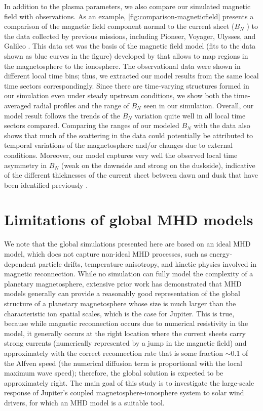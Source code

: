 In addition to the plasma parameters, we also compare our simulated magnetic field with observations. As an example, \ref{fig:comparison-magneticfield} presents a comparison of the magnetic field component normal to the current sheet ($B_N$ ) to the data collected by previous missions, including Pioneer, Voyager, Ulysses, and Galileo \cite{Vogt2011a}. This data set was the basis of the magnetic field model (fits to the data shown as blue curves in the figure) developed by \cite{Vogt2011a} that allows to map regions in the magnetosphere to the ionosphere. The observational data were shown in different local time bins; thus, we extracted our model results from the same local time sectors correspondingly. Since there are time‐varying structures formed in our simulation even under steady upstream conditions, we show both the time‐averaged radial profiles and the range of $B_N$ seen in our simulation. Overall, our model result follows the trends of the $B_N$ variation quite well in all local time sectors compared. Comparing the ranges of our modeled $B_N$ with the data also shows that much of the scattering in the data could potentially be attributed to temporal variations of the magnetosphere and/or changes due to external conditions. Moreover, our model captures very well the observed local time asymmetry in $B_N$ (weak on the dawnside and strong on the duskside), indicative of the different thicknesses of the current sheet between dawn and dusk that have been identified previously \cite{Khurana2005,Kivelson2002a}.

\section{Limitations of global MHD models}
We note that the global simulations presented here are based on an ideal MHD model, which does not capture non-ideal MHD processes, such as energy‐dependent particle drifts, temperature anisotropy, and kinetic physics involved in magnetic reconnection. While no simulation can fully model the complexity of a planetary magnetosphere, extensive prior work has demonstrated that MHD models generally can provide a reasonably good representation of the global structure of a planetary magnetosphere whose size is much larger than the characteristic ion spatial scales, which is the case for Jupiter. This is true, because while magnetic reconnection occurs due to numerical resistivity in the model, it generally occurs at the right location where the current sheets carry strong currents (numerically represented by a jump in the magnetic field) and approximately with the correct reconnection rate that is some fraction $\sim$0.1 of the Alfven speed (the numerical diffusion term is proportional with the local maximum wave speed); therefore, the global solution is expected to be approximately right. The main goal of this study is to investigate the large‐scale response of Jupiter's coupled magnetosphere‐ionosphere system to solar wind drivers, for which an MHD model is a suitable tool.